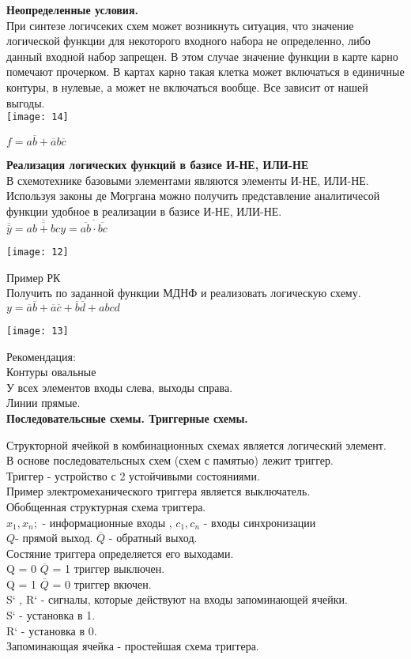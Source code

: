 \Large{ \textbf { Неопределенные условия.}}\\
При синтезе логичсеких схем может возникнуть ситуация, что значение логической функции для некоторого входного набора не определенно,
либо данный входной набор запрещен.
В этом случае значение функции в карте карно помечают прочерком.
В картах карно такая клетка может включаться в единичные контуры, в нулевые, а может не включаться вообще.
Все зависит от нашей выгоды.\\
\texttt{[image: 14]}

$
f = a\overline{b} + \overline{a}b\overline{c}
$



\Large{ \textbf { Реализация логических функций в базисе И-НЕ, ИЛИ-НЕ}}\\
В схемотехнике базовыми элементами являются элементы И-НЕ, ИЛИ-НЕ.
Используя законы де Могргана можно получить представление аналитичесой функции удобное в реализации в базисе И-НЕ, ИЛИ-НЕ.\\
$
\overline{\overline{y}} = \overline{\overline{ab + bc}}
y = \overline{\overline{ab} \cdot \overline{bc}}
$

\texttt{[image: 12]}

Пример РК\\
Получить по заданной функции МДНФ и реализовать логическую схему.\\
$
y = \overline{a}\overline{b} + \overline{a}\overline{c} +\overline{b} \overline{d} + abcd
$

\texttt{[image: 13]}

Рекомендация: \\
Контуры овальные\\
У всех элементов входы слева, выходы справа.\\
Линии прямые. \\
\Large{ \textbf { Последовательсные схемы.
Триггерные схемы.}}

Структорной ячейкой в комбинационных схемах является логический элемент.\\
В основе последовательсных схем (схем с памятью) лежит триггер.\\
Триггер - устройство с 2 устойчивыми состояниями.\\
Пример электромеханического триггера является выключатель.\\

Обобщенная структурная схема триггера.\\
$x_1, x_n ;$ - информационные входы , $c_1, c_n$ - входы синхронизации\\
$Q$- прямой выход. $\overline{Q}$ - обратный выход.\\
Состяние триггера определяется его выходами.\\
Q = 0  $\overline{Q}$ = 1 триггер выключен.\\
Q = 1  $\overline{Q}$ = 0 триггер вкючен.\\
S` , R`  - сигналы, которые действуют на входы запоминающей ячейки.\\
S` - установка в 1.\\
R` - установка в 0.\\
Запоминающая ячейка - простейшая схема триггера.\\
